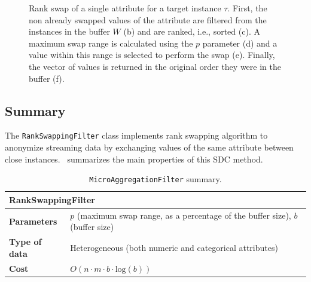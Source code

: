 \begin{figure}
\centering
{}
\caption[Rank swap of an attribute.]{Rank swap of a single attribute for a target instance $\tau$. First, the non already swapped values of the attribute are filtered from the instances in the buffer $W$ (b) and are ranked, i.e., sorted (c). A maximum swap range is calculated using the $p$ parameter (d) and a value within this range is selected to perform the swap (e). Finally, the vector of values is returned in the original order they were in the buffer (f).}
\label{fig:rank-swapping-schematic-2}
\end{figure}

\subsection{Summary}
\label{Implementation:RankSwapping:Summary}

The \texttt{RankSwappingFilter} class implements rank swapping algorithm to anonymize streaming data by exchanging values of the same attribute between close instances.~ summarizes the main properties of this SDC method.

\begin{table}[h]
	\centering
	\begin{tabular}{@{}ll@{}}
	\toprule
	\multicolumn{2}{l}{\textbf{RankSwappingFilter}}                             \\ \midrule
	\textbf{Parameters}   & $p$ (maximum swap range, as a percentage of the buffer size), $b$ (buffer size) \\
	\textbf{Type of data} & Heterogeneous (both numeric and categorical attributes) \\
	\textbf{Cost}         & $O(n \cdot m \cdot b \cdot \mathrm{log}(b))$  \\ \bottomrule
	\end{tabular}
	\caption{\texttt{MicroAggregationFilter} summary.}
	\label{table:rankswapping-summary}
\end{table}